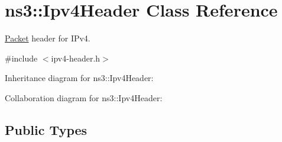 \hypertarget{classns3_1_1Ipv4Header}{}\section{ns3\+:\+:Ipv4\+Header Class Reference}
\label{classns3_1_1Ipv4Header}


\hyperlink{classns3_1_1Packet}{Packet} header for I\+Pv4.  




{\ttfamily \#include $<$ipv4-\/header.\+h$>$}



Inheritance diagram for ns3\+:\+:Ipv4\+Header\+:


Collaboration diagram for ns3\+:\+:Ipv4\+Header\+:
\subsection*{Public Types}
